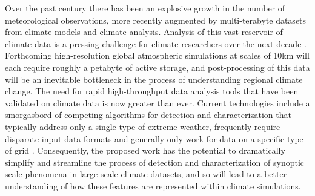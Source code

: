 \documentclass[11pt]{article}
\begin{document}
Over the past century there has been an explosive growth in the number of meteorological observations, more recently augmented by multi-terabyte datasets from climate models and climate analysis.  Analysis of this vast reservoir of climate data is a pressing challenge for climate researchers over the next decade \citep{levy2012bigdata, ganguly2008data}.  Forthcoming high-resolution global atmospheric simulations at scales of 10km will each require roughly a petabyte of active storage, and post-processing of this data will be an inevitable bottleneck in the process of understanding regional climate change.  The need for rapid high-throughput data analysis tools that have been validated on climate data is now greater than ever.  Current technologies include a smorgasbord of competing algorithms for detection and characterization that typically address only a single type of extreme weather, frequently require disparate input data formats and generally only work for data on a specific type of grid \citep{neu2013imilast}.  Consequently, the proposed work has the potential to dramatically simplify and streamline the process of detection and characterization of synoptic scale phenomena in large-scale climate datasets, and so will lead to a better understanding of how these features are represented within climate simulations.



\end{document}
